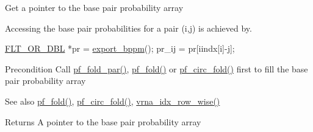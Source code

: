 Get a pointer to the base pair probability array

Accessing the base pair probabilities for a pair (i,j) is achieved by. 


\begin{DoxyCode}
\hyperlink{group__data__structures_ga31125aeace516926bf7f251f759b6126}{FLT\_OR\_DBL} *pr  = \hyperlink{group__pf__fold_gac5ac7ee281aae1c5cc5898a841178073}{export\_bppm}();
pr\_ij           = pr[iindx[i]-j];
\end{DoxyCode}


\begin{DoxyPrecond}{Precondition}
Call \hyperlink{group__pf__fold_gac4f95bee734b2563a3d6e9932117ebdf}{pf\+\_\+fold\+\_\+par()}, \hyperlink{group__pf__fold_gadc3db3d98742427e7001a7fd36ef28c2}{pf\+\_\+fold()} or \hyperlink{group__pf__fold_ga819ce5fca8984004ac81c4a3b04cb735}{pf\+\_\+circ\+\_\+fold()} first to fill the base pair probability array
\end{DoxyPrecond}
\begin{DoxySeeAlso}{See also}
\hyperlink{group__pf__fold_gadc3db3d98742427e7001a7fd36ef28c2}{pf\+\_\+fold()}, \hyperlink{group__pf__fold_ga819ce5fca8984004ac81c4a3b04cb735}{pf\+\_\+circ\+\_\+fold()}, \hyperlink{group__utils_ga70b180e9ea764218a82647a1cd347445}{vrna\+\_\+idx\+\_\+row\+\_\+wise()}
\end{DoxySeeAlso}
\begin{DoxyReturn}{Returns}
A pointer to the base pair probability array 
\end{DoxyReturn}
\mbox{\label{group__pf__fold_ga42faebdfce6f070c5f89adfc8427525c}} 
